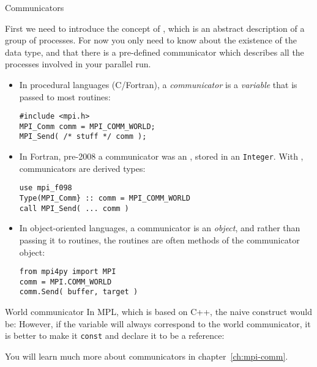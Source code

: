  {Communicators}

First we need to introduce the concept of
, which is an abstract description of a
group of processes. For now you only need to know about the existence
of the  data type, and that there is a
pre-defined communicator  which
describes all the processes involved in your parallel run.

\begin{itemize}
  \item
In procedural languages (C/Fortran), a
\emph{communicator} is a \emph{variable}
that is passed to most routines:
\lstset{language=C}
\begin{lstlisting}
#include <mpi.h>
MPI_Comm comm = MPI_COMM_WORLD;
MPI_Send( /* stuff */ comm );
\end{lstlisting}

\item
  In Fortran, pre-2008 a communicator was an ,
  stored in an \lstinline{Integer}. With ,
  communicators are derived types:
\lstset{language=Fortran}
\begin{lstlisting}
use mpi_f098
Type(MPI_Comm} :: comm = MPI_COMM_WORLD
call MPI_Send( ... comm )
\end{lstlisting}

\item
In object-oriented languages, a communicator is an
\emph{object},
and rather than passing it to routines,
the routines are often methods of the communicator object:
\lstset{language=Python}
\begin{lstlisting}
from mpi4py import MPI
comm = MPI.COMM_WORLD
comm.Send( buffer, target )
\end{lstlisting}
\end{itemize}

\begin{mplnote}{World communicator}
  In MPL, which is based on C++,
  the naive construct would be:
  However, if the variable will always correspond to the world communicator,
  it is better to make it \lstinline{const} and declare it to be a reference:
\end{mplnote}

You will
learn much more about communicators in chapter~\ref{ch:mpi-comm}.

